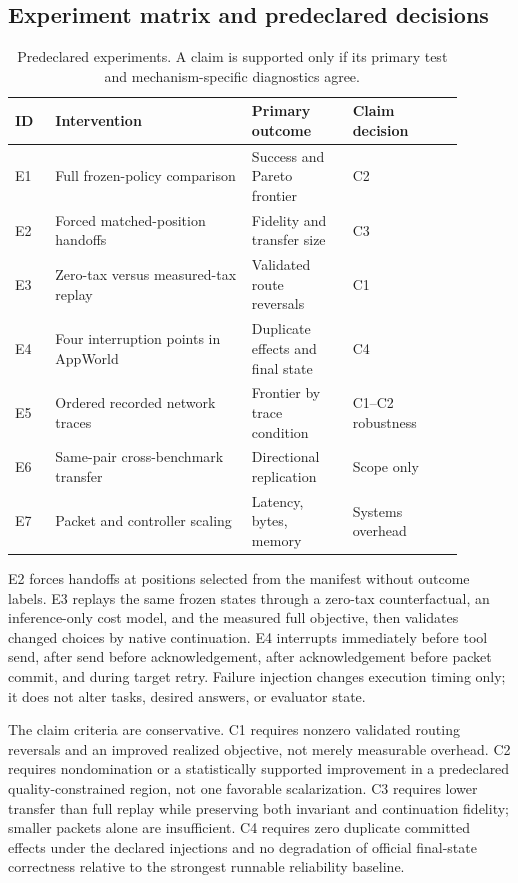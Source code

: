 \documentclass[10pt]{article}
\begin{document}
\subsection{Experiment matrix and predeclared decisions}

\begin{table}[t]
\centering
\small
\caption{Predeclared experiments. A claim is supported only if its primary
test and mechanism-specific diagnostics agree.}
\label{tab:experiments}
\begin{tabular}{p{0.08\linewidth}p{0.39\linewidth}p{0.20\linewidth}p{0.22\linewidth}}
\toprule
ID & Intervention & Primary outcome & Claim decision \\
\midrule
E1 & Full frozen-policy comparison & Success and Pareto frontier & C2 \\
E2 & Forced matched-position handoffs & Fidelity and transfer size & C3 \\
E3 & Zero-tax versus measured-tax replay & Validated route reversals & C1 \\
E4 & Four interruption points in AppWorld & Duplicate effects and final state & C4 \\
E5 & Ordered recorded network traces & Frontier by trace condition & C1--C2 robustness \\
E6 & Same-pair cross-benchmark transfer & Directional replication & Scope only \\
E7 & Packet and controller scaling & Latency, bytes, memory & Systems overhead \\
\bottomrule
\end{tabular}
\end{table}

E2 forces handoffs at positions selected from the manifest without outcome
labels. E3 replays the same frozen states through a zero-tax counterfactual,
an inference-only cost model, and the measured full objective, then validates
changed choices by native continuation. E4 interrupts immediately before
tool send, after send before acknowledgement, after acknowledgement before
packet commit, and during target retry. Failure injection changes execution
timing only; it does not alter tasks, desired answers, or evaluator state.

The claim criteria are conservative. C1 requires nonzero validated routing
reversals and an improved realized objective, not merely measurable overhead.
C2 requires nondomination or a statistically supported improvement in a
predeclared quality-constrained region, not one favorable scalarization. C3
requires lower transfer than full replay while preserving both invariant and
continuation fidelity; smaller packets alone are insufficient. C4 requires
zero duplicate committed effects under the declared injections and no
degradation of official final-state correctness relative to the strongest
runnable reliability baseline.
\end{document}
